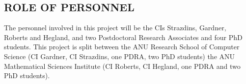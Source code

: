
\subsection*{ROLE OF PERSONNEL}

%

The personnel involved in this project will be the CIs Strazdins, Gardner,
Roberts and Hegland, 
and
two Postdoctoral Research Associates and four PhD students.  This
project is split between the ANU Research School of Computer Science
(CI Gardner, CI Strazdins, one PDRA, two PhD students) the ANU
Mathematical Sciences Institute (CI Roberts, CI Hegland, one PDRA and
two PhD students).


